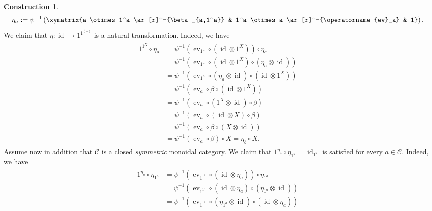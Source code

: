 \documentclass{article}
\newcommand{\id}{\operatorname{id}}%
\newcommand{\ev}{\operatorname{ev}}%
\newcommand{\C}{\mathcal{C}}
\numberwithin{equation}{section}
\theoremstyle{definition}
\newtheorem{construction}[definition]{Construction}
\theoremstyle{theorem}
\begin{document}
\begin{construction}
    \begin{equation}
         \eta_a := \psi^{-1}\left( \xymatrix{a \otimes 1^a \ar[r]^-{\beta_{a,1^a}} & 1^a \otimes a \ar[r]^-{\ev_a} & 1} \right).
    \end{equation}
    We claim that $\eta \colon \id \to 1^{1^{(-)}}$ is a natural transformation. Indeed, we have 
    \begin{align}
        \begin{split}
            1^{1^X} \circ \eta_a &= 
            \psi^{-1}(\ev_{1^a} \circ (\id \otimes 1^X)) \circ \eta_a \\ %
            &= \psi^{-1}(\ev_{1^a} \circ (\id \otimes 1^X) \circ (\eta_a \otimes \id)) \\ %
            &= \psi^{-1}(\ev_{1^a} \circ (\eta_a \otimes \id) \circ (\id \otimes 1^X)) \\ %
            &= \psi^{-1}(\ev_{a} \circ \beta \circ (\id \otimes 1^X)) \\ %
            &= \psi^{-1}(\ev_{a} \circ (1^X \otimes \id) \circ \beta) \\
            &= \psi^{-1}(\ev_{a} \circ (\id \otimes X) \circ \beta) \\
            &= \psi^{-1}(\ev_{a} \circ \beta \circ (X \otimes \id)) \\
            &= \psi^{-1}(\ev_{a} \circ \beta) \circ X %
            = \eta_b \circ X. %
        \end{split} 
    \end{align} 
    Assume now in addition that $\C$ is a closed \emph{symmetric} monoidal category. 
    We claim that $1^{\eta_a} \circ \eta_{1^a} = \id_{1^a}$ is satisfied for every $a \in \C$. Indeed, we have 
    \begin{align}
        \begin{split}
            1^{\eta_a} \circ \eta_{1^a} 
            &= \psi^{-1}(\ev_{1^{1^a}} \circ (\id \otimes \eta_a)) \circ \eta_{1^a} \\ %
            &= \psi^{-1}(\ev_{1^{1^a}} \circ (\id \otimes \eta_a) \circ (\eta_{1^a} \otimes \id)) \\ %
            &= \psi^{-1}(\ev_{1^{1^a}} \circ (\eta_{1^a} \otimes \id) \circ (\id \otimes \eta_a)) \\ %

\end{split}
\end{align}
\end{construction}
\end{document}
